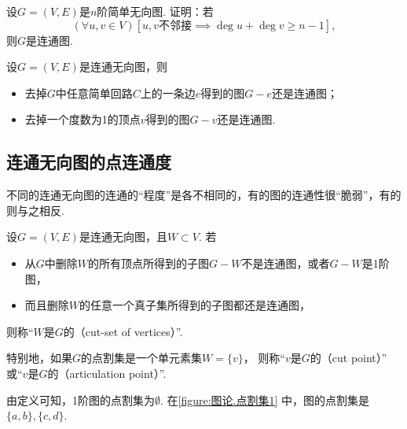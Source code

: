 \begin{example}
设\(G = (V,E)\)是\(n\)阶简单无向图.
证明：若\[
	(\forall u,v \in V)
	\left[
		\text{$u,v$不邻接}
		\implies
		\deg u + \deg v \geq n - 1
	\right],
\]
则\(G\)是连通图.
\end{example}

\begin{theorem}
设\(G = (V,E)\)是连通无向图，则\begin{itemize}
	\item 去掉\(G\)中任意简单回路\(C\)上的一条边\(e\)得到的图\(G - e\)还是连通图；
	\item 去掉一个度数为1的顶点\(v\)得到的图\(G - v\)还是连通图.
\end{itemize}
\end{theorem}

\subsection{连通无向图的点连通度}
不同的连通无向图的连通的“程度”是各不相同的，有的图的连通性很“脆弱”，有的则与之相反.

\begin{definition}
设\(G = (V,E)\)是连通无向图，且\(W \subset V\).
若\begin{itemize}
	\item 从\(G\)中删除\(W\)的所有顶点所得到的子图\(G-W\)不是连通图，或者\(G-W\)是1阶图，
	\item 而且删除\(W\)的任意一个真子集所得到的子图都还是连通图，
\end{itemize}
则称“\(W\)是\(G\)的（cut-set of vertices）”.

特别地，如果\(G\)的点割集是一个单元素集\(W = \{v\}\)，
则称“\(v\)是\(G\)的（cut point）”
或“\(v\)是\(G\)的（articulation point）”.
\end{definition}

由定义可知，1阶图的点割集为\(\emptyset\).
在\cref{figure:图论.点割集1} 中，图的点割集是\(\{a,b\},\{c,d\}\).


